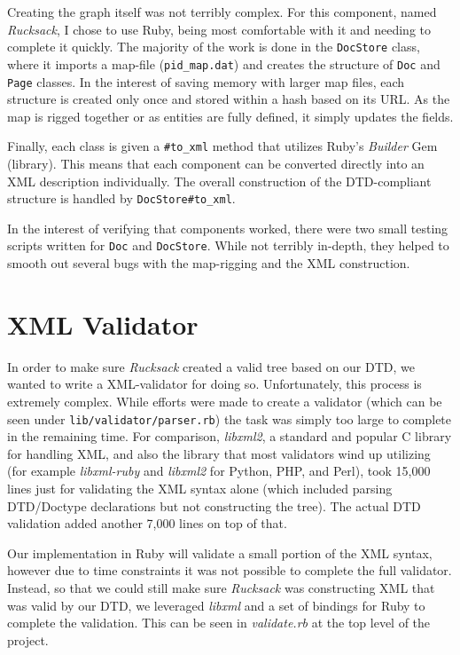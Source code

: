 \documentclass[letterpaper,11pt,twoside]{article}
\begin{document}
Creating the graph itself was not terribly complex. For this component, named \emph{Rucksack}, I chose to use Ruby, being most comfortable with it and needing to complete it quickly. The majority of the work is done in the \texttt{DocStore} class, where it imports a map-file (\texttt{pid\_map.dat}) and creates the structure of \texttt{Doc} and \texttt{Page} classes. In the interest of saving memory with larger map files, each structure is created only once and stored within a hash based on its URL. As the map is rigged together or as entities are fully defined, it simply updates the fields.

Finally, each class is given a \texttt{\#to\_xml} method that utilizes Ruby's \emph{Builder} Gem (library). This means that each component can be converted directly into an XML description individually. The overall construction of the DTD-compliant structure is handled by \texttt{DocStore\#to\_xml}.

In the interest of verifying that components worked, there were two small testing scripts written for \texttt{Doc} and \texttt{DocStore}. While not terribly in-depth, they helped to smooth out several bugs with the map-rigging and the XML construction.

\section{XML Validator}
In order to make sure \emph{Rucksack} created a valid tree based on our DTD, we wanted to write a XML-validator for doing so. Unfortunately, this process is extremely complex. While efforts were made to create a validator (which can be seen under \texttt{lib/validator/parser.rb}) the task was simply too large to complete in the remaining time. For comparison, \emph{libxml2}, a standard and popular C library for handling XML, and also the library that most validators wind up utilizing (for example \emph{libxml-ruby} and \emph{libxml2} for Python, PHP, and Perl), took 15,000 lines just for validating the XML syntax alone (which included parsing DTD/Doctype declarations but not constructing the tree). The actual DTD validation added another 7,000 lines on top of that.

Our implementation in Ruby will validate a small portion of the XML syntax, however due to time constraints it was not possible to complete the full validator. Instead, so that we could still make sure \emph{Rucksack} was constructing XML that was valid by our DTD, we leveraged \emph{libxml} and a set of bindings for Ruby to complete the validation. This can be seen in \emph{validate.rb} at the top level of the project.
\end{document}
